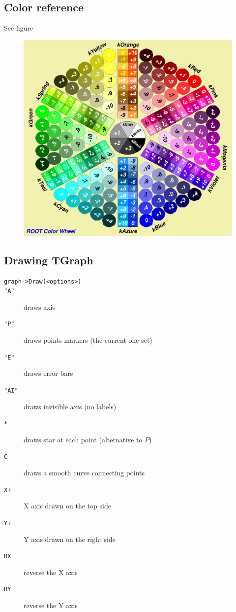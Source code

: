\documentclass[10pt, twoside]{article}
\newcommand{\ttt}[1]{\colorbox{boxgray}{\texttt{#1}}}
\begin{document}
\subsection{Color reference}
See figure
\begin{figure}[H]
\centering
\includegraphics[scale=0.2]{imgs_root/maxres.png}
\end{figure}

\subsection{Drawing TGraph}
\begin{description}
\item[\ttt{graph->Draw(<options>)}]
\item[\ttt{"A"}] draws axis
\item[\ttt{"P"}] draws points markers (the current one set)
\item[\ttt{"E"}] draws error bars
\item[\ttt{"AI"}] draws invisible axis (no labels)
\item[\ttt{*}] draws star at each point (alternative to $P$)
\item[\ttt{C}] draws a smooth curve connecting points
\item[\ttt{X+}] X axis drawn on the top side
\item[\ttt{Y+}] Y axis drawn on the right side
\item[\ttt{RX}] reverse the X axis
\item[\ttt{RY}] reverse the Y axis
\end{description}
\end{document}
